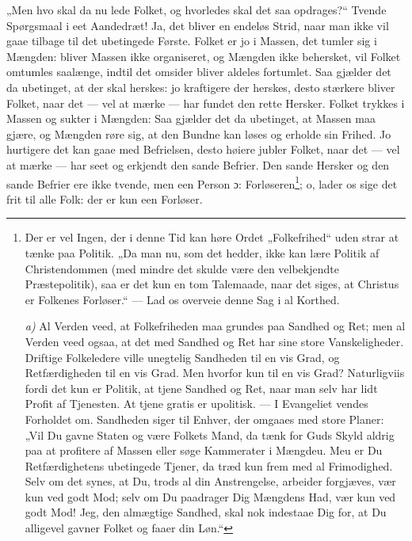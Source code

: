 \documentclass[12pt,a4paper]{book}
\begin{document}
„Men hvo skal da nu lede Folket, og hvorledes skal det saa opdrages?“ Tvende Spørgsmaal i
eet Aandedræt! Ja, det bliver en endeløs Strid, naar man ikke vil gaae tilbage til det
ubetingede Første. Folket er jo i Massen, det tumler sig i Mængden: bliver Massen ikke
organiseret, og Mængden ikke behersket, vil Folket omtumles saalænge, indtil det omsider
bliver aldeles fortumlet. Saa gjælder det da ubetinget, at der skal herskes: jo kraftigere
der herskes, desto stærkere bliver Folket, naar det --- vel at mærke --- har fundet den
rette Hersker. Folket trykkes i Massen og sukter i Mængden:
Saa gjælder det da ubetinget, at Massen maa gjære, og Mængden røre sig, at den Bundne kan
løses og erholde sin Frihed. Jo hurtigere det kan gaae med Befrielsen, desto høiere jubler
Folket, naar det --- vel at mærke --- har seet og erkjendt den sande Befrier. Den sande
Hersker og den sande Befrier ere ikke tvende, men een Person ɔ: Forløseren\footnote{%
Der er vel Ingen, der i denne Tid kan høre Ordet „Folkefrihed“ uden strar at tænke paa
Politik. „Da man nu, som det hedder, ikke kan lære Politik af Christendommen (med mindre
det skulde være den velbekjendte Præstepolitik), saa er det kun en tom Talemaade, naar det
siges, at Christus er Folkenes Forløser.“ --- Lad os overveie denne Sag i al Korthed.

\textit{a)} Al Verden veed, at Folkefriheden maa grundes paa Sandhed og Ret; men al Verden
veed ogsaa, at det med Sandhed og Ret har sine store Vanskeligheder. Driftige Folkeledere
ville unegtelig Sandheden til en vis Grad, og Retfærdigheden til en vis Grad. Men hvorfor
kun til en vis Grad? Naturligviis fordi det kun er Politik, at tjene Sandhed og Ret, naar
man selv har lidt Profit af Tjenesten. At tjene gratis er upolitisk. --- I Evangeliet
vendes Forholdet om. Sandheden siger til Enhver, der omgaaes med store Planer: „Vil Du
gavne Staten og være Folkets Mand, da tænk for Guds Skyld aldrig paa at profitere af
Massen eller søge Kammerater i Mængdeu. Meu er Du Retfærdighetens ubetingede Tjener, da
træd kun frem med al Frimodighed. Selv om det synes, at Du, trods al din Anstrengelse,
arbeider forgjæves, vær kun ved godt Mod; selv om Du paadrager Dig Mængdens Had, vær kun
ved godt Mod! Jeg, den almægtige Sandhed, skal nok indestaae Dig for, at Du alligevel
gavner Folket og faaer din Løn.“%
}; o, lader os sige det frit til alle Folk: der er kun een Forløser.
\end{document}
